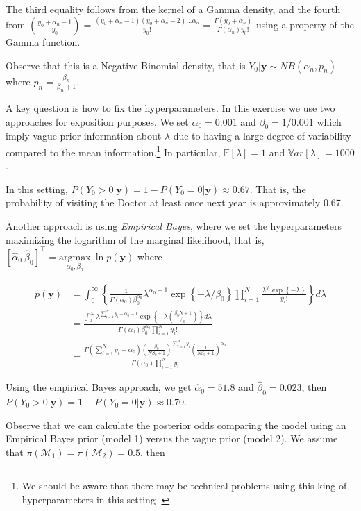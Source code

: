 The third equality follows from the kernel of a Gamma density, and the fourth from ${y_0+\alpha_n-1 \choose y_0}=\frac{(y_0+\alpha_n-1)(y_0+\alpha_n-2)\dots\alpha_n}{y_0!}=\frac{\Gamma(y_0+\alpha_n)}{\Gamma(\alpha_n)y_0!}$ using a property of the Gamma function.

Observe that this is a Negative Binomial density, that is $Y_0|\mathbf{y}\sim NB(\alpha_n,p_n)$ where $p_n=\frac{\beta_n}{\beta_n+1}$. 

A key question is how to fix the hyperparameters. In this exercise we use two approaches for exposition purposes. We set $\alpha_0=0.001$ and $\beta_0=1/0.001$ which imply vague prior information about $\lambda$ due to having a large degree of variability compared to the mean information.\footnote{We should be aware that there may be technical problems using this king of hyperparameters in this setting \cite{gelman2006prior}.} In particular, $\mathbb{E}[\lambda]=1$ and $\mathbb{V}ar[\lambda]=1000$. 

In this setting, $P(Y_0>0|\mathbf{y})=1-P(Y_0=0|\mathbf{y})\approx 0.67$. That is, the probability of visiting the Doctor at least once next year is approximately 0.67.

Another approach is using \textit{Empirical Bayes}, where we set the hyperparameters maximizing the logarithm of the marginal likelihood, that is, $\left[\hat{\alpha}_0 \ \hat{\beta}_0\right]^{\top}=\underset{\alpha_0 ,\beta_0}{\mathrm{argmax}} \ \ln p(\mathbf{y})$ where

\begin{align*}
	p(\mathbf{y})&=\int_0^{\infty}\left\{\frac{1}{\Gamma(\alpha_0)\beta_0^{\alpha_0}}\lambda^{\alpha_0-1}\exp\left\{-\lambda/\beta_0\right\} \prod_{i=1}^N\frac{\lambda^{y_i}\exp\left\{-\lambda\right\}}{ y_i!}\right\}d\lambda\\
	&=\frac{\int_0^{\infty}\lambda^{\sum_{i=1}^N y_i+\alpha_0-1}\exp\left\{-\lambda \left(\frac{\beta_0 N +1}{\beta_0}\right) \right\}d\lambda}{\Gamma(\alpha_0)\beta_0^{\alpha_0}\prod_{i=1}^N y_i!}\\
	&=\frac{\Gamma(\sum_{i=1}^N y_i+\alpha_0)\left(\frac{\beta_0}{N\beta_0+1}\right)^{\sum_{i=1}^N y_i}\left(\frac{1}{N\beta_0+1}\right)^{\alpha_0}}{\Gamma(\alpha_0)\prod_{i=1}^N y_i}
\end{align*}

Using the empirical Bayes approach, we get $\hat{\alpha}_0=51.8$ and $\hat{\beta}_0=0.023$, then $P(Y_0>0|\mathbf{y})=1-P(Y_0=0|\mathbf{y})\approx 0.70$.

Observe that we can calculate the posterior odds comparing the model using an Empirical Bayes prior (model 1) versus the vague prior (model 2). We assume that $\pi(\mathcal{M}_1)=\pi(\mathcal{M}_2)=0.5$, then

